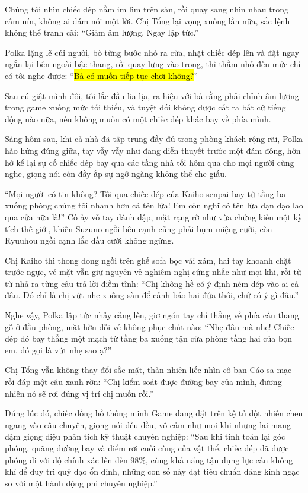 \documentclass[../main.tex]{subfiles}
\begin{document}
Chúng tôi nhìn chiếc dép nằm im lìm trên sàn, rồi quay sang nhìn nhau trong câm nín, không ai dám nói một lời. Chị Tổng lại vọng xuống lần nữa, sắc lệnh không thể tranh cãi: ``Giảm âm lượng. Ngay lập tức.''

Polka lặng lẽ cúi người, bò từng bước nhỏ ra cửa, nhặt chiếc dép lên và đặt ngay ngắn lại bên ngoài bậc thang, rồi quay lưng vào trong, thì thầm nhỏ đến mức chỉ có tôi nghe được: ``\hl{Bà có muốn tiếp tục chơi không?}''

Sau cú giật mình đôi, tôi lắc đầu lia lịa, ra hiệu với bà rằng phải chỉnh âm lượng trong game xuống mức tối thiểu, và tuyệt đối không được cất ra bất cứ tiếng động nào nữa, nếu không muốn có một chiếc dép khác bay về phía mình.

\ct

Sáng hôm sau, khi cả nhà đã tập trung đầy đủ trong phòng khách rộng rãi, Polka hào hứng đứng giữa, tay vẫy vẫy như đang diễn thuyết trước một đám đông, hớn hở kể lại sự cố chiếc dép bay qua các tầng nhà tối hôm qua cho mọi người cùng nghe, giọng nói còn đầy ắp sự ngỡ ngàng không thể che giấu.

``Mọi người có tin không? Tối qua chiếc dép của Kaiho-senpai bay từ tầng ba xuống phòng chúng tôi nhanh hơn cả tên lửa! Em còn nghĩ có tên lửa đạn đạo lao qua cửa nữa là!'' Cô ấy vỗ tay đánh đập, mặt rạng rỡ như vừa chứng kiến một kỳ tích thế giới, khiến Suzuno ngồi bên cạnh cũng phải bụm miệng cười, còn Ryuuhou ngồi cạnh lắc đầu cười không ngừng.

Chị Kaiho thì thong dong ngồi trên ghế sofa bọc vải xám, hai tay khoanh chặt trước ngực, vẻ mặt vẫn giữ nguyên vẻ nghiêm nghị cứng nhắc như mọi khi, rồi từ từ nhả ra từng câu trả lời điềm tĩnh: ``Chị không hề có ý định ném dép vào ai cả đâu. Đó chỉ là chị vứt nhẹ xuống sàn để cảnh báo hai đứa thôi, chứ có ý gì đâu.''

Nghe vậy, Polka lập tức nhảy cẫng lên, giơ ngón tay chỉ thẳng về phía cầu thang gỗ ở đầu phòng, mặt hờn dỗi vẻ không phục chút nào: ``Nhẹ đâu mà nhẹ! Chiếc dép đó bay thẳng một mạch từ tầng ba xuống tận cửa phòng tầng hai của bọn em, đó gọi là vứt nhẹ sao ạ?''

Chị Tổng vẫn không thay đổi sắc mặt, thản nhiên liếc nhìn cô bạn Cáo sa mạc rồi đáp một câu xanh rờn: ``Chị kiểm soát được đường bay của mình, đương nhiên nó sẽ rơi đúng vị trí chị muốn rồi.''

Đúng lúc đó, chiếc đồng hồ thông minh Game đang đặt trên kệ tủ đột nhiên chen ngang vào câu chuyện, giọng nói đều đều, vô cảm như mọi khi nhưng lại mang đậm giọng điệu phân tích kỹ thuật chuyên nghiệp: ``Sau khi tính toán lại góc phóng, quãng đường bay và điểm rơi cuối cùng của vật thể, chiếc dép đã được phóng đi với độ chính xác lên đến 98\%, cùng khả năng tận dụng lực cản không khí để duy trì quỹ đạo ổn định, những con số này đạt tiêu chuẩn đáng kinh ngạc so với một hành động phi chuyên nghiệp.''
\end{document}
